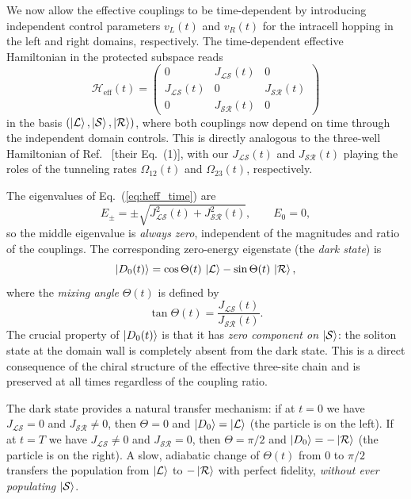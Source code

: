 \documentclass[
  reprint,
  amsmath,
  amssymb,
  aps,
  prb,
  floatfix,
  longbibliography,
]{revtex4-2}
\newcommand{\Heff}{\mathcal{H}_{\mathrm{eff}}}
\newcommand{\JLS}{J_{\mathcal{LS}}}
\newcommand{\JSR}{J_{\mathcal{SR}}}
\newcommand{\ketL}{\ket{\mathcal{L}}}
\newcommand{\ketS}{\ket{\mathcal{S}}}
\newcommand{\ketR}{\ket{\mathcal{R}}}
\begin{document}
We now allow the effective couplings to be time-dependent by introducing
independent control parameters $v_L(t)$ and $v_R(t)$ for the intracell
hopping in the left and right domains, respectively. The time-dependent
effective Hamiltonian in the protected subspace reads
\begin{equation}
  \Heff(t) =
  \begin{pmatrix}
    0 & \JLS(t) & 0 \\
    \JLS(t) & 0 & \JSR(t) \\
    0 & \JSR(t) & 0
  \end{pmatrix}
  \label{eq:heff_time}
\end{equation}
in the basis $(\ketL, \ketS, \ketR)$, where both couplings now depend on
time through the independent domain controls. This is directly analogous to
the three-well Hamiltonian of Ref.~\cite{Greentree2004} [their Eq.~(1)],
with our $\JLS(t)$ and $\JSR(t)$ playing the roles of the tunneling rates
$\Omega_{12}(t)$ and $\Omega_{23}(t)$, respectively.

The eigenvalues of Eq.~(\ref{eq:heff_time}) are
\begin{equation}
  E_\pm = \pm\sqrt{\JLS^2(t) + \JSR^2(t)}, \qquad E_0 = 0,
  \label{eq:ctap_eigenvalues}
\end{equation}
so the middle eigenvalue is \emph{always zero}, independent of the magnitudes
and ratio of the couplings. The corresponding zero-energy eigenstate (the
\emph{dark state}) is~\cite{Greentree2004}
\begin{equation}
  \ket{D_0(t)} = \cos\Theta(t)\,\ketL - \sin\Theta(t)\,\ketR,
  \label{eq:darkstate}
\end{equation}
where the \emph{mixing angle} $\Theta(t)$ is defined by
\begin{equation}
  \tan\Theta(t) = \frac{\JLS(t)}{\JSR(t)}.
  \label{eq:mixing_angle}
\end{equation}
The crucial property of $\ket{D_0(t)}$ is that it has \emph{zero component
on} $\ketS$: the soliton state at the domain wall is completely absent from
the dark state. This is a direct consequence of the chiral structure of the
effective three-site chain and is preserved at all times regardless of the
coupling ratio.

The dark state provides a natural transfer mechanism: if at $t = 0$ we have
$\JLS = 0$ and $\JSR \neq 0$, then $\Theta = 0$ and $\ket{D_0} = \ketL$
(the particle is on the left). If at $t = T$ we have $\JLS \neq 0$ and
$\JSR = 0$, then $\Theta = \pi/2$ and $\ket{D_0} = -\ketR$ (the particle
is on the right). A slow, adiabatic change of $\Theta(t)$ from $0$ to $\pi/2$
transfers the population from $\ketL$ to $-\ketR$ with perfect fidelity,
\emph{without ever populating} $\ketS$.
\end{document}
